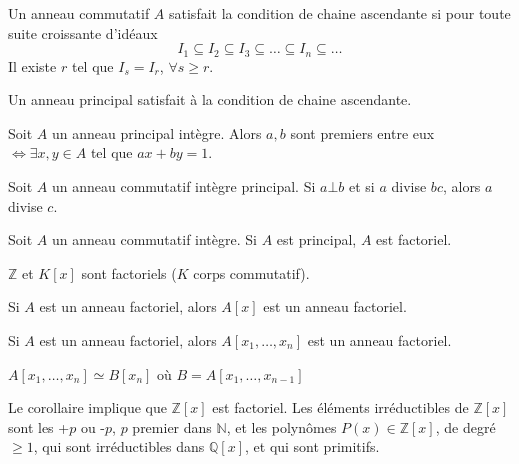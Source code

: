\documentclass[12pt,a4paper]{article}
\begin{document}
\begin{flushleft}
\begin{mydef}
Un anneau commutatif $A$ satisfait la condition de chaine ascendante si pour toute suite croissante d'idéaux
$$I_1 \subseteq I_2 \subseteq I_3 \subseteq \ldots \subseteq I_n \subseteq \ldots$$
Il existe $r$ tel que $I_s = I_r$, $\forall s \geq r$.
\end{mydef}

\begin{lem}
Un anneau principal satisfait à la condition de chaine ascendante.
\end{lem}

\begin{lem}
Soit $A$ un anneau principal intègre. Alors $a, b$ sont premiers entre eux $\Leftrightarrow \exists x, y \in A$ tel que $ax + by = 1$.
\end{lem}

\begin{lem}
Soit $A$ un anneau commutatif intègre principal. Si $a \bot b$ et si $a$ divise $bc$, alors $a$ divise $c$.
\end{lem}

\begin{thm}
Soit $A$ un anneau commutatif intègre. Si $A$ est principal, $A$ est factoriel.
\end{thm}

\begin{cor}
$\mathbb{Z}$ et $K [x]$ sont factoriels ($K$ corps commutatif).
\end{cor}

\begin{thm}
Si $A$ est un anneau factoriel, alors $A[x]$ est un anneau factoriel.
\end{thm}

\begin{cor}
Si $A$ est un anneau factoriel, alors $A[x_1, \ldots , x_n]$ est un anneau factoriel.
\end{cor}

\begin{lem}
$A[x_1 , \ldots , x_n] \simeq B[x_n]$ où $B = A[x_1 , \ldots , x_{n-1}]$
\end{lem}

\begin{rem}
Le corollaire implique que $\mathbb{Z} [x]$ est factoriel. Les éléments irréductibles de $\mathbb{Z} [x]$ sont les +$p$ ou -$p$, $p$ premier dans $\mathbb{N}$, et les polynômes $P(x) \in \mathbb{Z} [x]$, de degré $\geq 1$, qui sont irréductibles dans $\mathbb{Q} [x]$, et qui sont primitifs. 
\end{rem}


\end{flushleft}
\end{document}
